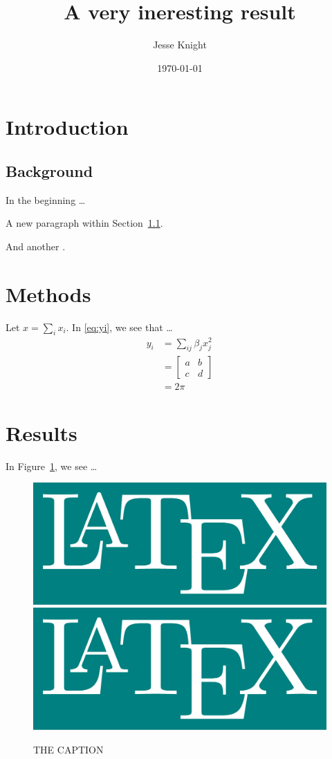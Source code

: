 \documentclass[12pt]{article}
\title{A very ineresting result}
\author{Jesse Knight}
\date{\today}
\begin{document}
  \maketitle %
  \section{Introduction}\label{intro}
  \subsection{Background}\label{intro.back}
  In the beginning \dots %
  \par
  A new paragraph within Section~\ref{intro.back}. %
  \par
  And another \cite{Last2023}. %
  \section{Methods}\label{meth}
  Let $x = \sum_i x_i$. %
  In \eqref{eq:yi}, we see that \dots %
  \begin{subequations} %
    \label{eq:yi} %
    \begin{align} %
      y_i &= \sum_{ij} \beta_j x^2_j \\ %
          &= \left[ \begin{matrix} a & b \\ c & d \end{matrix} \right] \\ %
          &= 2 \pi %
    \end{align}
  \end{subequations}
  \section{Results}\label{res}
  In Figure~\ref{fig:latex}, we see \dots %
  \begin{figure} %
    \centering %
    \includegraphics[width=.5\linewidth]{latex}%
    \includegraphics[width=.5\linewidth]{latex}
    \caption{THE CAPTION} %
    \label{fig:latex} %
  \end{figure}
  \printbibliography %
\end{document}
